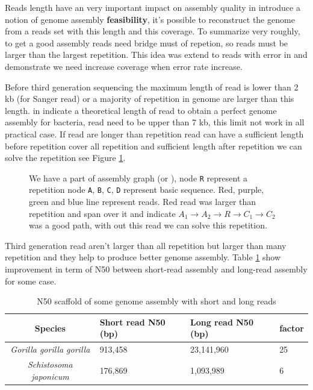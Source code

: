 \documentclass[./main.tex]{subfiles}
\begin{document}
Reads length have an very important impact on assembly quality \citeauthor{Bresler_Tse} in \cite{Bresler_Tse} introduce a notion of genome assembly \textbf{feasibility}, it's possible to reconstruct the genome from a reads set with this length and this coverage. To summarize very roughly, to get a good assembly reads need bridge must of repetion, so reads must be larger than the largest repetition. This idea was extend to reads with error in \cite{feasibility_with_error} and demonstrate we need increase coverage when error rate increase.

Before third generation sequencing the maximum length of read is lower than 2 kb (for Sanger read) or a majority of repetition in genome are larger than this length. \citeauthor{one_chromosome_one_contig} in \cite{one_chromosome_one_contig} indicate a theoretical length of read to obtain a perfect genome assembly for bacteria, read need to be upper than 7 kb, this limit not work in all practical case. If read are longer than repetition read can have a sufficient length before repetition cover all repetition and sufficient length after repetition we can solve the repetition see Figure \ref{intro:fig:whylongreads}.

\begin{figure}[ht]
    \centering
    
    \caption{We have a part of assembly graph (\OLC or \DBG), node \texttt{R} represent a repetition node \texttt{A}, \texttt{B}, \texttt{C}, \texttt{D} represent basic sequence. Red, purple, green and blue line represent reads. Red read was larger than repetition and span over it and indicate $A_1 \rightarrow A_2 \rightarrow R \rightarrow C_1 \rightarrow C_2$ was a good path, with out this read we can solve this repetition.}
    \label{intro:fig:whylongreads}
\end{figure}

Third generation read aren't larger than all repetition but larger than many repetition and they help to produce better genome assembly. Table \ref{intro:tab:sr_lr_assembly} show improvement in term of N50 between short-read assembly and long-read assembly for some case.

\begin{table}[]
    \centering
    \begin{tabular}{c|lll}
        Species & Short read N50 (bp) & Long read N50 (bp) & factor \\ \hline
        \textit{Gorilla gorilla gorilla} & 913,458 \cite{gorilla_sr_assembly} & 23,141,960 \cite{gorilla_genome} & 25 \\
        \textit{Schistosoma japonicum} & 176,869 \cite{s_japonicum_sr_assembly} & 1,093,989 \cite{s_japonicum_3rd_gene_improvement} & 6 \\
    \end{tabular}
    \caption{N50 scaffold of some genome assembly with short and long reads}
    \label{intro:tab:sr_lr_assembly}
\end{table}
\end{document}

